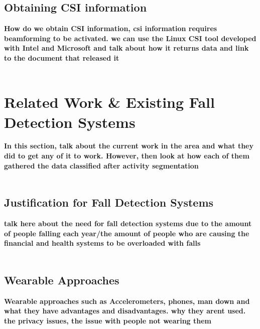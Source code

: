 \subsection{Obtaining CSI information}
\textbf{How do we obtain CSI information, csi information requires beamforming to be activated. we can use the Linux CSI tool developed with Intel and Microsoft and talk about how it returns data and link to the document that released it} \\\\




\section{Related Work \& Existing Fall Detection Systems}
\textbf{In this section, talk about the current work in the area and what they did to get any of it to work. However, then look at how each of them gathered the data classified after activity segmentation} \\\\






\subsection{Justification for Fall Detection Systems}
\textbf{talk here about the need for fall detection systems due to the amount of people falling each year/the amount of people who are causing the financial and health systems to be overloaded with falls} \\\\




\subsection{Wearable Approaches}
\textbf{Wearable approaches such as Accelerometers, phones, man down and what they have advantages and disadvantages. why they arent used. the privacy issues, the issue with people not wearing them} \\\\





